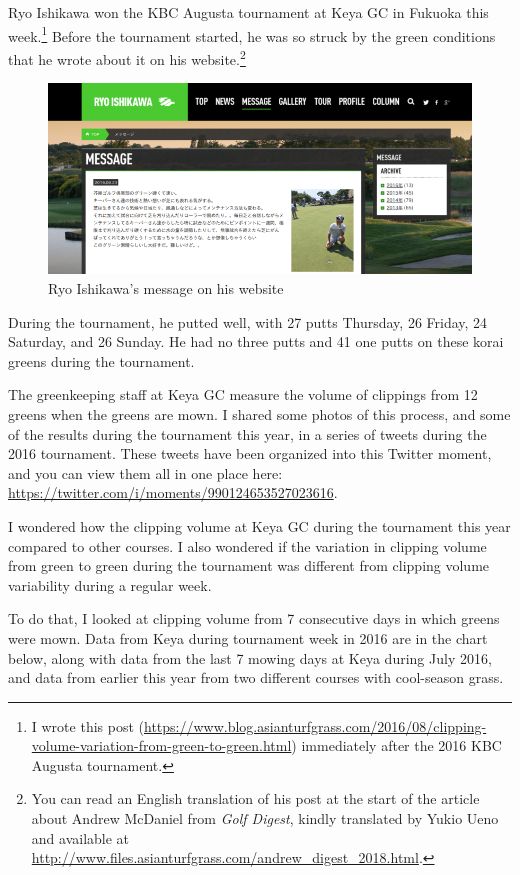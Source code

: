 \documentclass[12pt,b5,]{tufte-book}
\begin{document}
Ryo Ishikawa won the KBC Augusta tournament at Keya GC in Fukuoka this week.\footnote{I wrote this post (\url{https://www.blog.asianturfgrass.com/2016/08/clipping-volume-variation-from-green-to-green.html}) immediately after the 2016 KBC Augusta tournament.} Before the tournament started, he was so struck by the green conditions that he wrote about it on his website.\footnote{You can read an English translation of his post at the start of the article about Andrew McDaniel from \emph{Golf Digest}, kindly translated by Yukio Ueno and available at \url{http://www.files.asianturfgrass.com/andrew_digest_2018.html}.}

\begin{figure}
\centering
\includegraphics{img/b3-1.png}
\caption{Ryo Ishikawa's message on his website}
\end{figure}

During the tournament, he putted well, with 27 putts Thursday, 26 Friday, 24 Saturday, and 26 Sunday. He had no three putts and 41 one putts on these korai greens during the tournament.

The greenkeeping staff at Keya GC measure the volume of clippings from 12 greens when the greens are mown. I shared some photos of this process, and some of the results during the tournament this year, in a series of tweets during the 2016 tournament. These tweets have been organized into this Twitter moment, and you can view them all in one place here: \url{https://twitter.com/i/moments/990124653527023616}.

I wondered how the clipping volume at Keya GC during the tournament this year compared to other courses. I also wondered if the variation in clipping volume from green to green during the tournament was different from clipping volume variability during a regular week.

To do that, I looked at clipping volume from 7 consecutive days in which greens were mown. Data from Keya during tournament week in 2016 are in the chart below, along with data from the last 7 mowing days at Keya during July 2016, and data from earlier this year from two different courses with cool-season grass.
\end{document}
